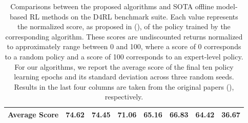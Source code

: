 \begin{table}[t]
\begin{tabular}{c|c|c|c|c|c|c|c|c}
\hline
\hline
\multicolumn{2}{c|}{Average Score} & {\textbf{74.62}} & {74.45} & {71.06} & {65.16} & {66.83} & {64.42} & {36.67} \\
\hline 
\end{tabular}
\caption{Comparisons between the proposed algorithms and SOTA offline model-based RL methods on the D4RL benchmark suite. Each value represents the normalized score, as proposed in (\cite{DBLP:journals/corr/abs-2004-07219}), of the policy trained by the corresponding algorithm. These scores are undiscounted returns normalized to approximately range between 0 and 100, where a score of 0 corresponds to a random policy and a score of 100 corresponds to an expert-level policy. For our algorithms, we report the average score of the final ten policy learning epochs and its standard deviation across three random seeds. Results in the last four columns are taken from the original papers (\cite{DBLP:conf/iclr/LuBPOR22, DBLP:conf/nips/YuKRRLF21, DBLP:conf/nips/KidambiRNJ20, DBLP:conf/nips/YuTYEZLFM20}), respectively.} 
\label{table:1}
\end{table}

